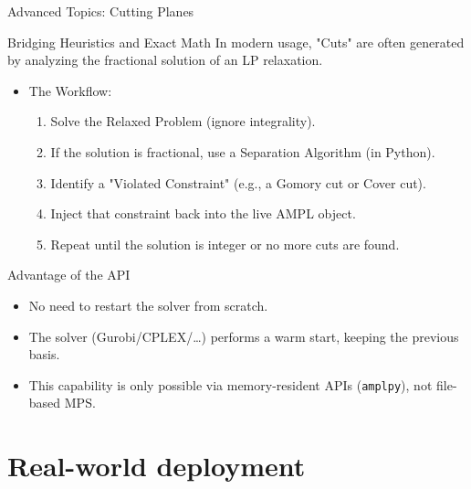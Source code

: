 \documentclass[presentation, aspectratio=169]{beamer}
\begin{document}
\begin{frame}[label={sec:orga8ccfc8},fragile]{Advanced Topics: Cutting Planes}
 \begin{block}{Bridging Heuristics and Exact Math}
In modern usage, "Cuts" are often generated by analyzing the fractional solution of an LP relaxation.

\begin{itemize}
\item \alert{\alert{The Workflow}}:
\begin{enumerate}
\item Solve the \alert{\alert{Relaxed Problem}} (ignore integrality).
\item If the solution is fractional, use a \alert{\alert{Separation Algorithm}} (in Python).
\item Identify a "Violated Constraint" (e.g., a Gomory cut or Cover cut).
\item \alert{\alert{Inject}} that constraint back into the live AMPL object.
\item Repeat until the solution is integer or no more cuts are found.
\end{enumerate}
\end{itemize}
\end{block}

\begin{block}{Advantage of the API}
\begin{itemize}
\item No need to restart the solver from scratch.
\item The solver (Gurobi/CPLEX/\ldots{}) performs a \alert{\alert{warm start}}, keeping the previous basis.
\item This capability is only possible via memory-resident APIs (\texttt{amplpy}), not file-based MPS.
\end{itemize}
\end{block}
\end{frame}



\section{Real-world deployment}
\label{sec:orgd1bf125}
\end{document}
